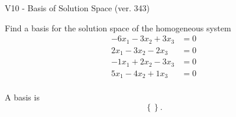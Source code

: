 \begin{exercise}
  \begin{exerciseTitle}V10 - Basis of Solution Space (ver. 343)\end{exerciseTitle}
  \begin{exerciseStatement}
    Find a basis for the solution space of the homogeneous system 
\begin{align*}
 -6 x_ 1 -3 x_ 2 + 3 x_ 3 &= 0  \\ 
  2 x_ 1 -3 x_ 2 -2 x_ 3 &= 0  \\ 
  -1 x_ 1 + 2 x_ 2 -3 x_ 3 &= 0  \\ 
  5 x_ 1 -4 x_ 2 + 1 x_ 3 &= 0  \\ 
 \end{align*}


 
  \end{exerciseStatement}

  \begin{exerciseAnswer}
   A basis is   
\[\left\{\right\}.\]

  


  \end{exerciseAnswer}
\end{exercise}